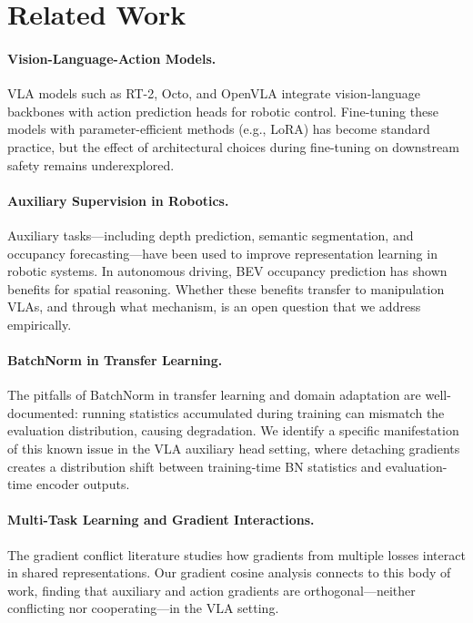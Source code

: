 \documentclass[10pt,letterpaper]{article}
\begin{document}
\section{Related Work}

\paragraph{Vision-Language-Action Models.}
VLA models such as RT-2, Octo, and OpenVLA integrate vision-language backbones with action prediction heads for robotic control. Fine-tuning these models with parameter-efficient methods (e.g., LoRA) has become standard practice, but the effect of architectural choices during fine-tuning on downstream safety remains underexplored.

\paragraph{Auxiliary Supervision in Robotics.}
Auxiliary tasks---including depth prediction, semantic segmentation, and occupancy forecasting---have been used to improve representation learning in robotic systems. In autonomous driving, BEV occupancy prediction has shown benefits for spatial reasoning. Whether these benefits transfer to manipulation VLAs, and through what mechanism, is an open question that we address empirically.

\paragraph{BatchNorm in Transfer Learning.}
The pitfalls of BatchNorm in transfer learning and domain adaptation are well-documented: running statistics accumulated during training can mismatch the evaluation distribution, causing degradation. We identify a specific manifestation of this known issue in the VLA auxiliary head setting, where detaching gradients creates a distribution shift between training-time BN statistics and evaluation-time encoder outputs.

\paragraph{Multi-Task Learning and Gradient Interactions.}
The gradient conflict literature studies how gradients from multiple losses interact in shared representations. Our gradient cosine analysis connects to this body of work, finding that auxiliary and action gradients are orthogonal---neither conflicting nor cooperating---in the VLA setting.
\end{document}
